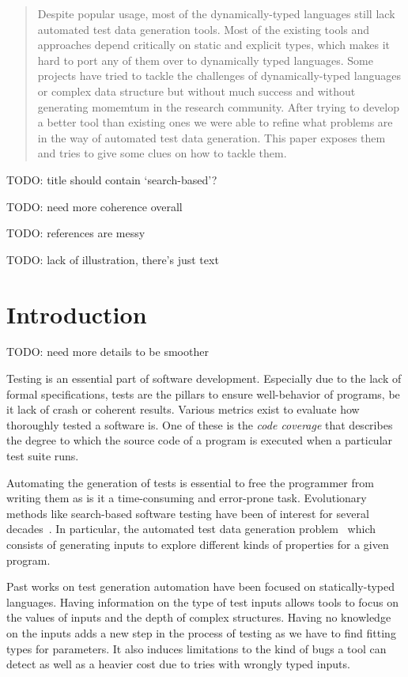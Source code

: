 \documentclass{llncs2e/llncs}
\makeatletter
\def\todo#1{{\color{red}TODO\@: #1}}
\makeatother
\begin{document}
\vfill

\begin{abstract}
Despite popular usage, most of the dynamically-typed languages still lack
automated test data generation tools. Most of the existing tools and approaches
depend critically on static and explicit types, which makes it hard to port any
of them over to dynamically typed languages. Some projects have tried to tackle
the challenges of dynamically-typed languages or complex data structure but
without much success and without generating momemtum in the research community.
After trying to develop a better tool than existing ones we were able to refine
what problems are in the way of automated test data generation. This paper
exposes them and tries to give some clues on how to tackle them.
\end{abstract}
%
\newpage

\todo{title should contain `search-based'?}

\todo{need more coherence overall}

\todo{references are messy}

\todo{lack of illustration, there's just text}
\section{Introduction}
\todo{need more details to be smoother}

Testing is an essential part of software development. Especially due to the lack
of formal specifications, tests are the pillars to ensure well-behavior of
programs, be it lack of crash or coherent results. Various metrics exist to
evaluate how thoroughly tested a software is. One of these is the \textit{code
coverage} that describes the degree to which the source code of a program is
executed when a particular test suite runs.

Automating the generation of tests is essential to free the programmer from
writing them as is it a time-consuming and error-prone task. Evolutionary
methods like search-based software testing have been of interest for several
decades~\cite{miller1976automatic}. In particular, the automated test data
generation problem~\cite{korel1990automated} which consists of generating inputs
to explore different kinds of properties for a given program.

Past works on test generation automation have been focused on statically-typed
languages. Having information on the type of test inputs allows tools to focus
on the values of inputs and the depth of complex structures. Having no knowledge
on the inputs adds a new step in the process of testing as we have to find
fitting types for parameters. It also induces limitations to the kind of bugs a
tool can detect as well as a heavier cost due to tries with wrongly typed
inputs.
\end{document}
